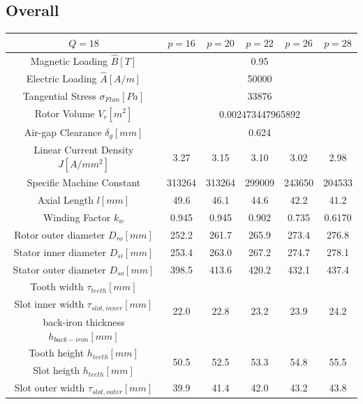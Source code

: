 \documentclass [a4 paper, 11pt, titlepage] {article}
\begin{document}
	\subsection{Overall}
	\begin{table}[h]
		\begin{center}
			\begin{tabular}{c|c|c|c|c|c}
				$Q=18$ & $p=16$ & $p=20$ & $p=22$ & $p=26$ & $p=28$ \\
				\hline
				Magnetic Loading $\hat{B}[T]$ & \multicolumn{5}{c}{0.95} \\
				Electric Loading $\hat{A}[A/m]$ & \multicolumn{5}{c}{50000} \\
				Tangential Stress $\sigma_{Ftan}[Pa]$ & \multicolumn{5}{c}{33876} \\
				Rotor Volume $V_r [m^2]$ & \multicolumn{5}{c}{0.002473447965892} \\
				Air-gap Clearance $\delta_g [mm]$ & \multicolumn{5}{c}{0.624} \\
				\hline\hline
				Linear Current Density $J [A/mm^2]$ & 3.27 & 3.15 & 3.10 & 3.02 & 2.98 \\
				Specific Machine Constant & 313264 & 313264 & 299009 & 243650 & 204533 \\
				Axial Length $l [mm]$ & 49.6 & 46.1 & 44.6 & 42.2 & 41.2 \\
				Winding Factor $k_w$ & 0.945 & 0.945 & 0.902 & 0.735 & 0.6170 \\
				Rotor outer diameter $D_{ro} [mm]$ & 252.2 & 261.7 & 265.9 & 273.4 & 276.8 \\
				Stator inner diameter $D_{si} [mm]$ & 253.4 & 263.0 & 267.2 & 274.7 & 278.1 \\
				Stator outer diameter $D_{so} [mm]$ & 398.5 & 413.6 & 420.2 & 432.1 & 437.4 \\
				Tooth width $\tau_{teeth} [mm]$ & \multirow{3}{4em}{22.0} & \multirow{3}{4em}{22.8} & \multirow{3}{4em}{23.2} & \multirow{3}{4em}{23.9} & \multirow{3}{4em}{24.2} \\
				Slot inner width $\tau_{slot,inner} [mm]$ & & & & & \\
				back-iron thickness $h_{back-iron} [mm]$ & & & & & \\
				Tooth height $h_{teeth} [mm]$ & \multirow{2}{4em}{50.5} & \multirow{2}{4em}{52.5} & \multirow{2}{4em}{53.3} & \multirow{2}{4em}{54.8} & \multirow{2}{4em}{55.5} \\
				Slot heigth $h_{teeth} [mm]$ &  &  &  &  & \\
				Slot outer width $\tau_{slot,outer} [mm]$ & 39.9 & 41.4 & 42.0 & 43.2 & 43.8 \\

\end{tabular}
\end{center}
\end{table}
\end{document}
